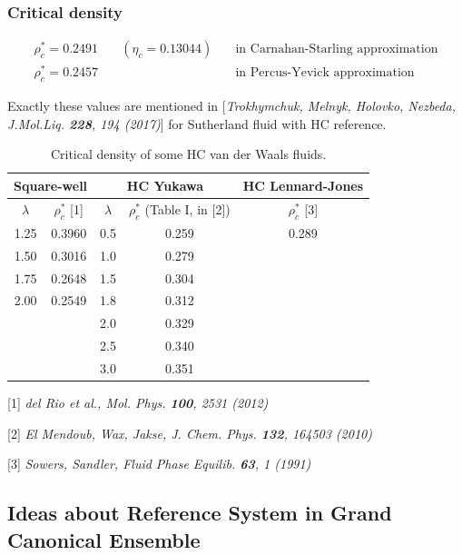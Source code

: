 \documentclass[8pt]{beamer}
\begin{document}
	\begin{frame}
		\frametitle{Critical density}
		
		\begin{eqnarray*}
			\rho^*_c = 0.2491 & \quad (\eta_c = 0.13044) & \quad \text{in Carnahan-Starling approximation}
			\\
			\rho^*_c = 0.2457 & & \quad \text{in Percus-Yevick approximation}
		\end{eqnarray*}
		
		 {
			Exactly these values are mentioned in [\textit{Trokhymchuk, Melnyk, Holovko, Nezbeda, J.Mol.Liq. \textbf{228}, 194 (2017)}] for Sutherland fluid with HC reference.
		}
		
		\begin{table}[h]
			\noindent\caption{Critical density of some HC van der Waals fluids.}
			\begin{tabular}{|c|c|c|c|c|}
				\hline
				\multicolumn{2}{|c|}{Square-well}& \multicolumn{2}{|c|}{HC Yukawa} &{HC Lennard-Jones} \\
				\hline
				$\lambda$ & $\rho_c^*$ [1]& $\lambda$ & $\rho_c^*$ (Table I, in [2]) & $\rho_c^*$ [3] \\
				\hline
				1.25 & 0.3960 & 0.5 & 0.259 & 0.289 \\
				1.50 & 0.3016 & 1.0 & 0.279 & \\
				1.75 & 0.2648 & 1.5 & 0.304 & \\
				2.00 & 0.2549 & 1.8 & 0.312 & \\
				     &        & 2.0 & 0.329 & \\
				     &        & 2.5 & 0.340 & \\
				     &        & 3.0 & 0.351 & \\
				\hline
			\end{tabular}
		\end{table}
		
		[1] \textit{del Rio et al., Mol. Phys. \textbf{100}, 2531 (2012)}
		
		[2] \textit{El Mendoub, Wax, Jakse, J. Chem. Phys. \textbf{132}, 164503 (2010)}
		
		[3] \textit{Sowers, Sandler, Fluid Phase Equilib. \textbf{63}, 1 (1991)}
	\end{frame}
	
	\subsection{Ideas about Reference System in Grand Canonical Ensemble}
	
\end{document}
